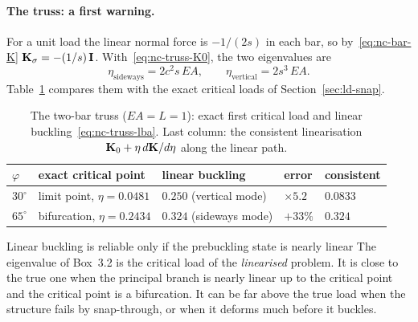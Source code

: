 \paragraph{The truss: a first warning.}
For a unit load the linear normal force is $-1/(2s)$ in each bar, so
by~\eqref{eq:nc-bar-K} $\mathbf{K}_\sigma = -(1/s)\,\mathbf{I}$. With~\eqref{eq:nc-truss-K0}, the two
eigenvalues are
\begin{equation}\label{eq:nc-truss-lba}
  \eta_{\mathrm{sideways}} = 2c^2s\,EA, \qquad \eta_{\mathrm{vertical}} = 2s^3\,EA .
\end{equation}
Table~\ref{tab:nc-lba} compares them with the exact critical loads of
Section~\ref{sec:ld-snap}.

\begin{table}[ht]
\centering
\caption{The two-bar truss ($EA = L = 1$): exact first critical load and linear
  buckling~\eqref{eq:nc-truss-lba}. Last column: the consistent linearisation
  $\mathbf{K}_0 + \eta\,d\mathbf{K}/d\eta$ along the linear path.}
\label{tab:nc-lba}
\begin{tabular}{@{}lllll@{}}
  \toprule
  $\varphi$ & exact critical point & linear buckling & error & consistent \\
  \midrule
  $30^\circ$ & limit point, $\eta = 0.0481$ & $0.250$ (vertical mode) & $\times 5.2$ & $0.0833$ \\
  $65^\circ$ & bifurcation, $\eta = 0.2434$ & $0.324$ (sideways mode) & $+33\%$ & $0.324$ \\
  \bottomrule
\end{tabular}
\end{table}

\begin{gbox}{Linear buckling is reliable only if the prebuckling state is nearly linear}\label{sec:nc-lbawarn}
%
The eigenvalue of Box~3.2 is the critical load of the \emph{linearised} problem. It is
close to the true one when the principal branch is nearly linear up to the critical
point and the critical point is a bifurcation. It can be far above the true load
when the structure fails by snap-through, or when it deforms much before it buckles.
\end{gbox}

